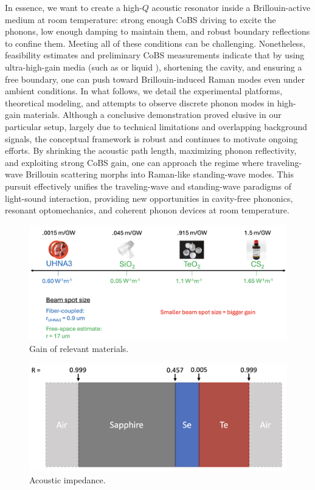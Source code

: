 In essence, we want to create a high-\(Q\) acoustic resonator inside a Brillouin-active medium at room temperature: strong enough \ac{CoBS} driving to excite the phonons, low enough damping to maintain them, and robust boundary reflections to confine them. Meeting all of these conditions can be challenging. Nonetheless, feasibility estimates and preliminary \ac{CoBS} measurements indicate that by using ultra-high-gain media (such as  \cite{sanghera2010nonlinear, abedin2005observation} or liquid  \cite{boyd2020nonlinear}), shortening the cavity, and ensuring a free boundary, one can push toward Brillouin-induced Raman modes even under ambient conditions. In what follows, we detail the experimental platforms, theoretical modeling, and attempts to observe discrete phonon modes in high-gain materials. Although a conclusive demonstration proved elusive in our particular setup, largely due to technical limitations and overlapping background signals, the conceptual framework is robust and continues to motivate ongoing efforts. By shrinking the acoustic path length, maximizing phonon reflectivity, and exploiting strong \ac{CoBS} gain, one can approach the regime where traveling-wave Brillouin scattering morphs into Raman-like standing-wave modes. This pursuit effectively unifies the traveling-wave and standing-wave paradigms of light-sound interaction, providing new opportunities in cavity-free phononics, resonant optomechanics, and coherent phonon devices at room temperature.

\begin{figure}[t]
  \centering
  \includegraphics[width=\textwidth]{figs/4-Raman/GainOfRelevantMaterials.png}
  \caption{Gain of relevant materials.}
  \label{fig:Raman:GainOfRelevantMaterials}
\end{figure}

\begin{figure}[t]
  \centering
  \includegraphics[width=\textwidth]{figs/4-Raman/AcousticImpedance.png}
  \caption{Acoustic impedance.}
  \label{fig:Raman:AcousticImpedance}
\end{figure}

